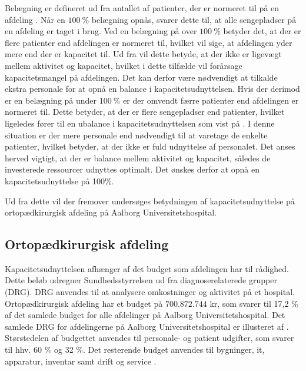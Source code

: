 Belægning er defineret ud fra antallet af patienter, der er normeret til på en afdeling \cite{Heidmann2014}. Når en $100~\%$ belægning opnås, svarer dette til, at alle sengepladser på en afdeling er taget i brug. Ved en belægning på over $100~\%$ betyder det, at der er flere patienter end afdelingen er normeret til, hvilket vil sige, at afdelingen yder mere end der er kapacitet til. Ud fra  vil dette betyde, at der ikke er ligevægt mellem aktivitet og kapacitet, hvilket i dette tilfælde vil forårsage kapacitetsmangel på afdelingen. Det kan derfor være nødvendigt at tilkalde ekstra personale for at opnå en balance i kapacitetsudnyttelsen.\cite{Pauly1986}
Hvis der derimod er en belægning på under $100~\%$ er der omvendt færre patienter end afdelingen er normeret til. Dette betyder, at der er flere sengepladser end patienter, hvilket ligeledes fører til en ubalance i kapacitetsudnyttelsen som vist på . I denne situation er der mere personale end nødvendigt til at varetage de enkelte patienter, hvilket betyder, at der ikke er fuld udnyttelse af personalet.\cite{Pauly1986} 
Det anses herved vigtigt, at der er balance mellem aktivitet og kapacitet, således de investerede ressourcer udnyttes optimalt. Det ønskes derfor at opnå en kapacitetsudnyttelse på 100\%. 

Ud fra dette vil der fremover undersøges betydningen af kapacitetsudnyttelse på ortopædkirurgisk afdeling på Aalborg Universitetshospital. 

\subsection{Ortopædkirurgisk afdeling}
Kapacitetsudnyttelsen afhænger af det budget som afdelingen har til rådighed. Dette beløb udregner Sundhedsstyrrelsen ud fra diagnoserelaterede grupper (DRG). DRG anvendes til at analysere omkostninger og aktivitet på et hospital.\cite{DRG2016} Ortopædkirurgisk afdeling har et budget på $700.872.744$ kr, som svarer til 17,2 \% af det samlede budget for alle afdelinger på Aalborg Universitetshospital. Det samlede DRG for afdelingerne på Aalborg Universitetshospital er illusteret af .\cite{Rasmussen2016}
Størstedelen af budgettet anvendes til personale- og patient udgifter, som svarer til hhv. 60 \% og 32 \%. Det resterende budget anvendes til bygninger, it, apparatur, inventar samt drift og service \cite{Noegletal2016}. 


